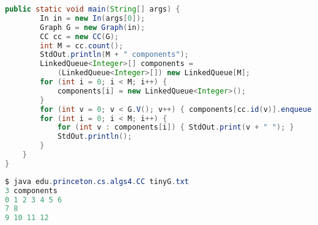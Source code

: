 \documentclass[8pt,a4paper,compress]{beamer}
\begin{document}
\begin{frame}[fragile]
\pause

\begin{lstlisting}[language=Java]
    public static void main(String[] args) {
        In in = new In(args[0]);
        Graph G = new Graph(in);
        CC cc = new CC(G);
        int M = cc.count();
        StdOut.println(M + " components");
        LinkedQueue<Integer>[] components = 
            (LinkedQueue<Integer>[]) new LinkedQueue[M];
        for (int i = 0; i < M; i++) { 
            components[i] = new LinkedQueue<Integer>(); 
        }
        for (int v = 0; v < G.V(); v++) { components[cc.id(v)].enqueue(v); }
        for (int i = 0; i < M; i++) {
            for (int v : components[i]) { StdOut.print(v + " "); }
            StdOut.println();
        }
    }
}
\end{lstlisting} 

\pause

\begin{lstlisting}[language=Java]
$ java edu.princeton.cs.algs4.CC tinyG.txt 
3 components
0 1 2 3 4 5 6 
7 8 
9 10 11 12 
\end{lstlisting} 
\end{frame}
\end{document}
